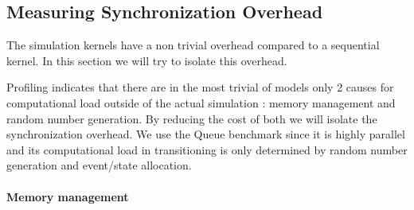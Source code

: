 \subsection{Measuring Synchronization Overhead}
The simulation kernels have a non trivial overhead compared to a sequential kernel. In this section we will try to isolate this overhead. 

Profiling indicates that there are in the most trivial of models only 2 causes for computational load outside of the actual simulation : memory management and random number generation. By reducing the cost of both we will isolate the synchronization overhead. We use the Queue benchmark since it is highly parallel and its computational load in transitioning is only determined by random number generation and event/state allocation.
\paragraph*{Memory management}\label{sec:4-subsec:overhead-pgraph:memory}
